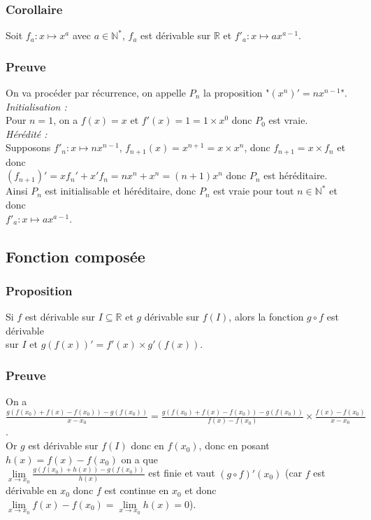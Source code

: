 \documentclass[a4paper,10pt]{book} %
\newcommand{\R}{\mathbb{R}}
\newcommand{\N}{\mathbb{N}}
\begin{document}
\subsubsection{Corollaire}
Soit $f_a : x\mapsto x^a$ avec $a\in \N^{*}$, $f_a$ est dérivable sur $\R$ et $f'_a : x\mapsto ax^{a-1}$.

\subsubsection{Preuve}
On va procéder par récurrence, on appelle $P_n$ la proposition "$(x^n)'=nx^{n-1}$".\\

\emph{Initialisation :}\\
Pour $n=1$, on a $f(x)=x$ et $f'(x)=1=1\times x^0$ donc $P_0$ est vraie.\\

\emph{Hérédité :}\\
Supposons $f'_n : x \mapsto nx^{n-1}$, $f_{n+1}(x)=x^{n+1}=x\times x^{n}$, donc $f_{n+1}=x\times f_n$ et donc\\
$(f_{n+1})'=xf_n'+x'f_n=nx^n+x^n=(n+1)x^{n}$ donc $P_n$ est héréditaire.\\

Ainsi $P_n$ est initialisable et héréditaire, donc $P_n$ est vraie pour tout $n\in \N^*$ et donc\\
$f'_{a} : x\mapsto ax^{a-1}$.

\newpage

\subsection{Fonction composée}
\subsubsection{Proposition}
Si $f$ est dérivable sur $I\subseteq \R$ et $g$ dérivable sur $f(I)$, alors la fonction $g\circ f$ est dérivable\\
sur $I$ et $g(f(x))'=f'(x)\times g'(f(x))$.

\subsubsection{Preuve}
On a $\frac{g(f(x_{0})+f(x)-f(x_{0}))-g(f(x_{0}))}{x-x_{0}}=\frac{g(f(x_{0})+f(x)-f(x_{0}))-g(f(x_{0}))}{f(x)-f(x_0)} \times \frac{f(x)-f(x_{0})}{x-x_{0}}$.\\

Or $g$ est dérivable sur $f(I)$ donc en $f(x_0)$, donc en posant $h(x)=f(x)-f(x_0)$ on a que\\
$\lim\limits_{x\rightarrow x_0}\frac{g(f(x_{0})+h(x))-g(f(x_{0}))}{h(x)}$ est finie et vaut $(g\circ f)'(x_0)$ (car $f$ est dérivable en $x_{0}$ donc $f$ est continue en $x_0$ et donc $\lim\limits_{x\rightarrow x_0}f(x)-f(x_{0})=\lim\limits_{x\rightarrow x_0} h(x)=0$).\\
\end{document}
